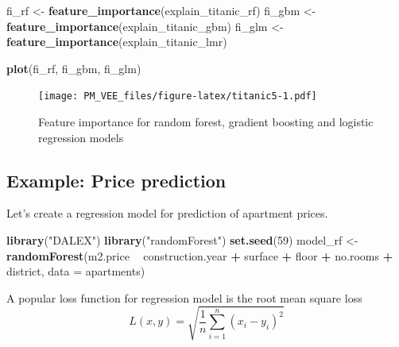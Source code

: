 \documentclass[12pt,]{krantz}
\newenvironment{Shaded}{\begin{snugshade}}{\end{snugshade}}
\newcommand{\DataTypeTok}[1]{\textcolor[rgb]{0.13,0.29,0.53}{#1}}
\newcommand{\DecValTok}[1]{\textcolor[rgb]{0.00,0.00,0.81}{#1}}
\newcommand{\KeywordTok}[1]{\textcolor[rgb]{0.13,0.29,0.53}{\textbf{#1}}}
\newcommand{\NormalTok}[1]{#1}
\newcommand{\OperatorTok}[1]{\textcolor[rgb]{0.81,0.36,0.00}{\textbf{#1}}}
\newcommand{\StringTok}[1]{\textcolor[rgb]{0.31,0.60,0.02}{#1}}
\theoremstyle{definition}
\theoremstyle{definition}
\theoremstyle{definition}
\theoremstyle{remark}
\begin{document}
\begin{Shaded}
\begin{Highlighting}[]
\NormalTok{fi_rf <-}\StringTok{ }\KeywordTok{feature_importance}\NormalTok{(explain_titanic_rf)}
\NormalTok{fi_gbm <-}\StringTok{ }\KeywordTok{feature_importance}\NormalTok{(explain_titanic_gbm)}
\NormalTok{fi_glm <-}\StringTok{ }\KeywordTok{feature_importance}\NormalTok{(explain_titanic_lmr)}

\KeywordTok{plot}\NormalTok{(fi_rf, fi_gbm, fi_glm)}
\end{Highlighting}
\end{Shaded}

\begin{figure}
\centering
\texttt{[image: PM\_VEE\_files/figure-latex/titanic5-1.pdf]}
\caption{\label{fig:titanic5}Feature importance for random forest, gradient
boosting and logistic regression models}
\end{figure}

\hypertarget{example-price-prediction}{%
\subsection{Example: Price prediction}\label{example-price-prediction}}

Let's create a regression model for prediction of apartment prices.

\begin{Shaded}
\begin{Highlighting}[]
\KeywordTok{library}\NormalTok{(}\StringTok{"DALEX"}\NormalTok{)}
\KeywordTok{library}\NormalTok{(}\StringTok{"randomForest"}\NormalTok{)}
\KeywordTok{set.seed}\NormalTok{(}\DecValTok{59}\NormalTok{)}
\NormalTok{model_rf <-}\StringTok{ }\KeywordTok{randomForest}\NormalTok{(m2.price }\OperatorTok{~}\StringTok{ }\NormalTok{construction.year }\OperatorTok{+}\StringTok{ }\NormalTok{surface }\OperatorTok{+}\StringTok{ }\NormalTok{floor }\OperatorTok{+}\StringTok{ }
\StringTok{                           }\NormalTok{no.rooms }\OperatorTok{+}\StringTok{ }\NormalTok{district, }\DataTypeTok{data =}\NormalTok{ apartments)}
\end{Highlighting}
\end{Shaded}

A popular loss function for regression model is the root mean square
loss \[
  L(x, y) = \sqrt{\frac1n \sum_{i=1}^n (x_i - y_i)^2}
\]

\begin{Shaded}
\end{Shaded}
\end{document}
